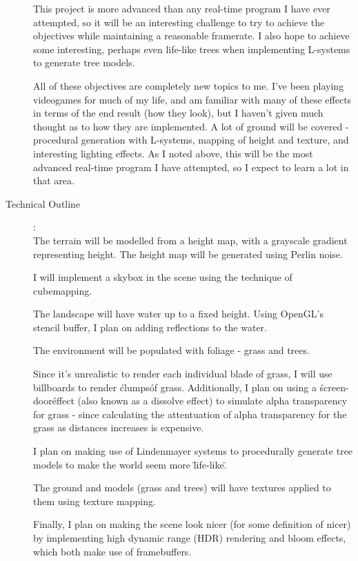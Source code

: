 \documentclass{article}
\begin{document}
\begin{description}
	This project is more advanced than any real-time program I have ever attempted, so it will be an interesting challenge to try to achieve the objectives while maintaining a reasonable framerate. I also hope to achieve some interesting, perhaps even life-like trees when implementing L-systems to generate tree models.

	All of these objectives are completely new topics to me. I've been playing videogames for much of my life, and am familiar with many of these effects in terms of the end result (how they look), but I haven't given much thought as to how they are implemented. A lot of ground will be covered - procedural generation with L-systems, mapping of height and texture, and interesting lighting effects. As I noted above, this will be the most advanced real-time program I have attempted, so I expect to learn a lot in that area.

\item[Technical Outline]:\\

    The terrain will be modelled from a height map, with a grayscale gradient representing height. The height map will be generated using Perlin noise.

    I will implement a skybox in the scene using the technique of cubemapping.

    The landscape will have water up to a fixed height. Using OpenGL's stencil buffer, I plan on adding reflections to the water.

    The environment will be populated with foliage - grass and trees. 

    Since it's unrealistic to render each individual blade of grass, I will use billboards to render \'clumps\' of grass. Additionally, I plan on using a \'screen-door\' effect (also known as a dissolve effect) to simulate alpha transparency for grass - since calculating the attentuation of alpha transparency for the grass as distances increases is expensive.

    I plan on making use of Lindenmayer systems to procedurally generate tree models to make the world seem more \"life-like\".

    The ground and models (grass and trees) will have textures applied to them using texture mapping. 

    Finally, I plan on making the scene look nicer (for some definition of nicer) by implementing high dynamic range (HDR) rendering and bloom effects, which both make use of framebuffers.

\end{description}
\end{document}
